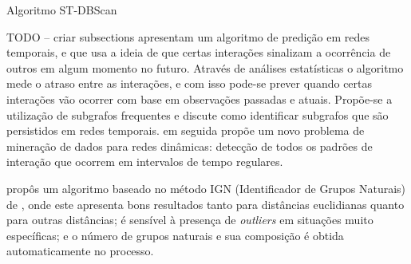 \pagebreak
\begin{algorithm}[h!]
	\SetSpacedAlgorithm
	\caption{\label{alg:algoritmo_stdbscan}Algoritmo ST-DBScan}
\end{algorithm}

TODO -- criar subsections 
\cite{lahiri2007} apresentam um algoritmo de predição em redes temporais, e que usa a ideia de que certas
interações sinalizam a ocorrência de outros em algum momento no futuro. Através de análises estatísticas
o algoritmo mede o atraso entre as interações, e com isso pode-se prever quando certas interações vão ocorrer
com base em observações passadas e atuais. Propõe-se a utilização de subgrafos frequentes e discute
como identificar subgrafos que são persistidos em redes temporais.
\cite{lahiri2008} em seguida propõe um novo problema de mineração de dados para redes dinâmicas:
detecção de todos os padrões de interação que ocorrem em intervalos de tempo regulares.

\cite{alfredo2009} propôs um algoritmo baseado no método IGN (Identificador de Grupos Naturais) de \cite{simposioNeg2003}, onde este apresenta bons resultados tanto para distâncias euclidianas quanto para outras distâncias; é sensível à presença de \textit{outliers} em situações muito específicas; e o número de grupos naturais e sua composição é obtida automaticamente no processo.



